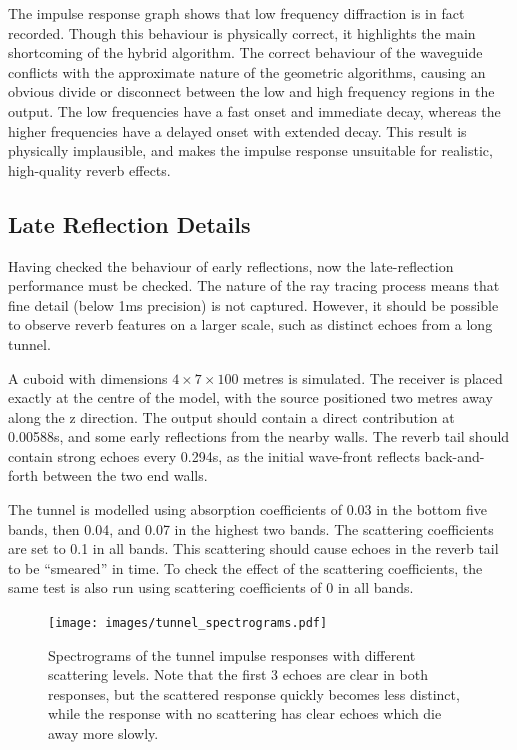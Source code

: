 \documentclass[]{scrreprt}
\begin{document}
The impulse response graph 
shows that low frequency diffraction is in fact recorded. Though this
behaviour is physically correct, it highlights the main shortcoming of
the hybrid algorithm. The correct behaviour of the waveguide conflicts
with the approximate nature of the geometric algorithms, causing an
obvious divide or disconnect between the low and high frequency regions
in the output. The low frequencies have a fast onset and immediate
decay, whereas the higher frequencies have a delayed onset with extended
decay. This result is physically implausible, and makes the impulse
response unsuitable for realistic, high-quality reverb effects.

\subsection{Late Reflection Details}\label{late-reflection-details}

Having checked the behaviour of early reflections, now the
late-reflection performance must be checked. The nature of the ray
tracing process means that fine detail (below 1ms precision) is not
captured. However, it should be possible to observe reverb features on a
larger scale, such as distinct echoes from a long tunnel.

A cuboid with dimensions \(4 \times 7 \times 100\) metres is simulated.
The receiver is placed exactly at the centre of the model, with the
source positioned two metres away along the z direction. The output
should contain a direct contribution at 0.00588s, and some early
reflections from the nearby walls. The reverb tail should contain strong
echoes every 0.294s, as the initial wave-front reflects back-and-forth
between the two end walls.

The tunnel is modelled using absorption coefficients of 0.03 in the
bottom five bands, then 0.04, and 0.07 in the highest two bands. The
scattering coefficients are set to 0.1 in all bands. This scattering
should cause echoes in the reverb tail to be ``smeared'' in time. To
check the effect of the scattering coefficients, the same test is also
run using scattering coefficients of 0 in all bands.

\begin{figure}[htbp]
\centering
\texttt{[image: images/tunnel\_spectrograms.pdf]}
\caption{Spectrograms of the tunnel impulse responses with different
scattering levels. Note that the first 3 echoes are clear in both
responses, but the scattered response quickly becomes less distinct,
while the response with no scattering has clear echoes which die away
more slowly.\label{fig:tunnel_spectrograms}}
\end{figure}
\end{document}
